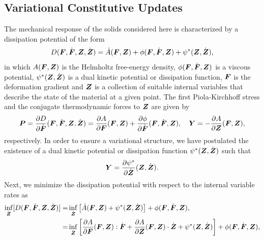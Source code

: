 \documentclass[12pt]{article}
\numberwithin{equation}{section}
\begin{document}
\subsection{Variational Constitutive Updates}

The mechanical response of the solids considered here is characterized
by a dissipation potential of the form
\begin{equation} \label{eq:power-density}
  D({\boldsymbol{F}}, \dot{{\boldsymbol{F}}}, {\boldsymbol{Z}}, \dot{{\boldsymbol{Z}}})
  =
  \dot{A}({\boldsymbol{F}}, {\boldsymbol{Z}})
  +
  \phi({\boldsymbol{F}}, \dot{{\boldsymbol{F}}}, {\boldsymbol{Z}})
  +
  \psi^*({\boldsymbol{Z}}, \dot{{\boldsymbol{Z}}}),
\end{equation}
in which $A({\boldsymbol{F}}, {\boldsymbol{Z}})$ is the Helmholtz free-energy density,
$\phi({\boldsymbol{F}}, \dot{{\boldsymbol{F}}}, {\boldsymbol{Z}})$ is a viscous potential, $\psi^*({\boldsymbol{Z}},
\dot{{\boldsymbol{Z}}})$ is a dual kinetic potential or dissipation function, ${\boldsymbol{F}}$
is the deformation gradient and ${\boldsymbol{Z}}$ is a collection of suitable
internal variables that describe the state of the material at a given
point. The first Piola-Kirchhoff stress and the conjugate
thermodynamic forces to ${\boldsymbol{Z}}$ are given by
\begin{equation} \label{eq:1PKstress-and-Y}
  {\boldsymbol{P}}
  =
  \frac{\partial D}{\partial \dot{{\boldsymbol{F}}}}({\boldsymbol{F}}, \dot{{\boldsymbol{F}}}, {\boldsymbol{Z}}, \dot{{\boldsymbol{Z}}})
  =
  \frac{\partial A}{\partial {\boldsymbol{F}}}({\boldsymbol{F}}, {\boldsymbol{Z}})
  +
  \frac{\partial \phi}{\partial \dot{{\boldsymbol{F}}}}({\boldsymbol{F}}, \dot{{\boldsymbol{F}}}, {\boldsymbol{Z}}),
  \quad
  {\boldsymbol{Y}} = - \frac{\partial A}{\partial {\boldsymbol{Z}}} ({\boldsymbol{F}}, {\boldsymbol{Z}}),
\end{equation} 
respectively. In order to ensure a variational structure, we have
postulated the existence of a dual kinetic potential or dissipation
function $\psi^*({\boldsymbol{Z}}, \dot{{\boldsymbol{Z}}})$ such that
\begin{equation} \label{eq:dual-kinetic-potential}
  {\boldsymbol{Y}} = \frac{\partial \psi^*}{\partial \dot{{\boldsymbol{Z}}}} ({\boldsymbol{Z}}, \dot{{\boldsymbol{Z}}}).
\end{equation}
Next, we minimize the dissipation potential 
with respect to the internal variable rates as
\begin{equation}
  \begin{split}
    \inf_{\dot{{\boldsymbol{Z}}}} [ D({\boldsymbol{F}}, \dot{{\boldsymbol{F}}}, {\boldsymbol{Z}}, \dot{{\boldsymbol{Z}}}) ]
    =
    &
    \inf_{\dot{{\boldsymbol{Z}}}}
    \left[
      \dot{A}({\boldsymbol{F}}, {\boldsymbol{Z}})
      +
      \psi^*({\boldsymbol{Z}}, \dot{{\boldsymbol{Z}}})
    \right] +
    \phi({\boldsymbol{F}}, \dot{{\boldsymbol{F}}}, {\boldsymbol{Z}}),
    \\
    =
    &
    \inf_{\dot{{\boldsymbol{Z}}}}
    \left[
      \frac{\partial A}{\partial {\boldsymbol{F}}}({\boldsymbol{F}}, {\boldsymbol{Z}}) : \dot{{\boldsymbol{F}}}
      +
      \frac{\partial A}{\partial {\boldsymbol{Z}}}({\boldsymbol{F}}, {\boldsymbol{Z}}) \cdot \dot{{\boldsymbol{Z}}}
      +
      \psi^*({\boldsymbol{Z}}, \dot{{\boldsymbol{Z}}})
    \right] +
    \phi({\boldsymbol{F}}, \dot{{\boldsymbol{F}}}, {\boldsymbol{Z}}),
  \end{split}
\end{equation}
\end{document}
